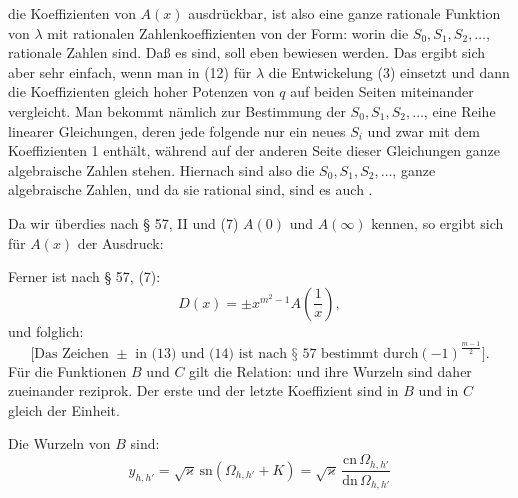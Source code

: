 die Koeffizienten von $A(x)$ ausdrückbar, ist also eine ganze rationale
Funktion von $\lambda$ mit rationalen Zahlenkoeffizienten von der Form:
worin die $S_0, S_1, S_2, \ldots$, rationale Zahlen sind. Daß es  sind, soll eben bewiesen werden. Das ergibt sich aber
sehr einfach, wenn man in (12) für $\lambda$ die Entwickelung (3) einsetzt
 und dann die Koeffizienten gleich hoher Potenzen von $q$ auf
beiden Seiten miteinander vergleicht. Man bekommt nämlich zur
Bestimmung der $S_0, S_1, S_2, \ldots$, eine Reihe linearer Gleichungen,
deren jede folgende nur ein neues $S_i$ und zwar mit dem Koeffizienten
 1 enthält, während auf der anderen Seite dieser Gleichungen
 ganze algebraische Zahlen stehen. Hiernach sind also
die $S_0, S_1, S_2, \ldots$, ganze algebraische Zahlen, und da sie rational
sind, sind es auch .

Da wir überdies nach § 57, II und (7) $A(0)$ und $A(\infty)$
kennen, so ergibt sich für $A(x)$ der Ausdruck:

Ferner ist nach § 57, (7):
\[
D(x) = \pm x^{m^2-1} A\left(\frac{1}{x}\right),
\]
und folglich:
\[
\text{[Das Zeichen } \pm \text{ in (13) und (14) ist nach § 57 bestimmt durch}
(-1)^{\frac{m-1}{2}}\text{].}
\]
Für die Funktionen $B$ und $C$ gilt die Relation:
und ihre Wurzeln sind daher zueinander reziprok. Der erste und
der letzte Koeffizient sind in $B$ und in $C$ gleich der Einheit.

Die Wurzeln von $B$ sind:
\[
y_{h,h'} = \sqrt{\varkappa}\,\mathrm{sn}(\Omega_{h,h'}+K) = \sqrt{\varkappa}\,\frac{\mathrm{cn}\,\Omega_{h,h'}}{\mathrm{dn}\,\Omega_{h,h'}}
\]

